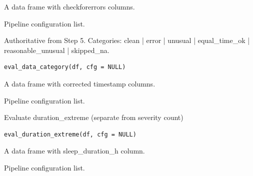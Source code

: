 \documentclass[a4paper]{book}
\begin{document}
%
\begin{Arguments}
\begin{ldescription}
\item[\code{df}] A data frame with checkforerrors columns.

\item[\code{cfg}] Pipeline configuration list.
\end{ldescription}
\end{Arguments}
%
\begin{Description}
Authoritative from Step 5. Categories: clean | error | unusual | equal\_time\_ok |
reasonable\_unusual | skipped\_na.
\end{Description}
%
\begin{Usage}
\begin{verbatim}
eval_data_category(df, cfg = NULL)
\end{verbatim}
\end{Usage}
%
\begin{Arguments}
\begin{ldescription}
\item[\code{df}] A data frame with corrected timestamp columns.

\item[\code{cfg}] Pipeline configuration list.
\end{ldescription}
\end{Arguments}
%
\begin{Description}
Evaluate duration\_extreme (separate from severity count)
\end{Description}
%
\begin{Usage}
\begin{verbatim}
eval_duration_extreme(df, cfg = NULL)
\end{verbatim}
\end{Usage}
%
\begin{Arguments}
\begin{ldescription}
\item[\code{df}] A data frame with sleep\_duration\_h column.

\item[\code{cfg}] Pipeline configuration list.
\end{ldescription}
\end{Arguments}
\end{document}
